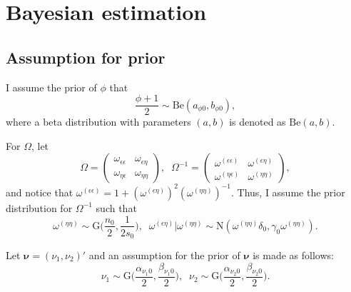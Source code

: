 \documentclass[11pt]{article}
\begin{document}
\section{Bayesian estimation}
\subsection{Assumption for prior}
I assume the prior of $\phi$ that 
\begin{equation}
\frac{\phi +1}{2} \sim\mathrm{Be}(a_{\phi 0}, b_{\phi 0}), 
\end{equation}
where a beta distribution with parameters $(a,b)$ is denoted as $\mathrm{Be}(a,b)$. 

For $\Omega$, let  
\begin{equation}
\Omega =\begin{pmatrix}
\omega_{\epsilon\epsilon} & \omega_{\epsilon\eta} \\
\omega_{\eta\epsilon} & \omega_{\eta\eta}
\end{pmatrix}, \;\;
\Omega^{-1} =\begin{pmatrix}
\omega^{(\epsilon\epsilon)} & \omega^{(\epsilon\eta)} \\
\omega^{(\eta\epsilon)} & \omega^{(\eta\eta)}
\end{pmatrix},
\end{equation}
and notice that 
$\omega^{(\epsilon\epsilon)} =1 +(\omega^{(\epsilon\eta)})^2 (\omega^{(\eta\eta)})^{-1}$. 
Thus, I assume the prior distribution for $\Omega^{-1}$ such that 
\begin{equation}
\omega^{(\eta\eta)}\sim\mathrm{G}\bigg(\frac{n_0}{2}, \frac{1}{2s_0}\bigg), \;\; 
\omega^{(\epsilon\eta)}|\omega^{(\eta\eta)}\sim\mathrm{N}(\omega^{(\eta\eta)}\delta_0, \gamma_0\omega^{(\eta\eta)}). 
\end{equation}

Let $\bm{\nu}=(\nu_1, \nu_2)'$ and an assumption for the prior of $\bm{\nu}$ is made as follows: 
\begin{equation}
\nu_1 \sim\mathrm{G}\bigg( \frac{\alpha_{\nu_1 0}}{2}, \frac{\beta_{\nu_1 0}}{2} \bigg), \;\;
\nu_2 \sim\mathrm{G}\bigg( \frac{\alpha_{\nu_2 0}}{2}, \frac{\beta_{\nu_2 0}}{2} \bigg). 
\end{equation}
\end{document}

